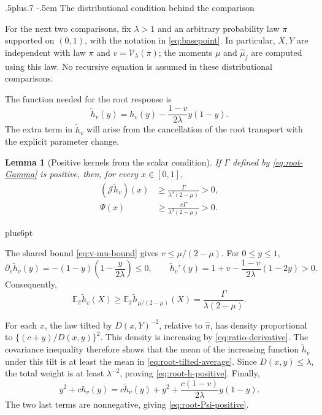 \documentclass[11pt,reqno]{amsart}
\makeatletter
\def\subsection{\@startsection{subsection}{2}{0pt}%
  {.5\linespacing plus.7\linespacing}
  {-.5em}
  {\normalfont\scshape}}
\theoremstyle{plain}
\newtheorem{lemma}[theorem]{Lemma}
\theoremstyle{definition}
\theoremstyle{remark}
\renewenvironment{proof}[1][\proofname]{%
  \par
  \pushQED{\qed}%
  \normalfont
  \topsep6pt plus6pt\relax
  \trivlist
  \item[\hskip\labelsep\slshape #1\@addpunct{.}]%
  \ignorespaces
}{%
  \popQED
  \endtrivlist
  \@endpefalse
}
\DeclareRobustCommand{\qed}{%
  \leavevmode\unskip\penalty9999\hbox{}\nobreak
  \ifmmode
    \makebox[0pt][l]{\qquad\hbox{\qedsymbol}}%
  \else
    \qquad\hbox{\qedsymbol}%
  \fi
}
\renewcommand{\qedsymbol}{\rule[.47pt]{4pt}{6pt}}
\numberwithin{equation}{section}
\newcommand{\E}{\mathbb E}
\newcommand{\cJ}{\mathcal J}
\makeatother
\begin{document}
\subsection{The distributional condition behind the comparison}

For the next two comparisons, fix $\lambda>1$ and an arbitrary probability
law $\pi$ supported on $(0,1)$, with the notation in
\eqref{eq:basepoint}. In particular, $X,Y$ are independent with law $\pi$
and $v=\mathcal V_\lambda(\pi)$; the moments $\mu$ and
$\widehat\mu_j$ are computed using this law. No recursive equation is
assumed in these distributional comparisons.

The function needed for the root response is
\begin{equation}\label{eq:root-h-tilde}
 \widetilde h_v(y)=h_v(y)-\frac{1-v}{2\lambda}y(1-y).
\end{equation}
The extra term in $\widetilde h_v$ will arise from the cancellation of
the root transport with the explicit parameter change.

\begin{lemma}[Positive kernels from the scalar condition]\label{lem:root-kernel}
If $\Gamma$ defined by \eqref{eq:root-Gamma} is positive, then, for every
$x\in[0,1]$,
\begin{align}
 (\cJ\widetilde h_v)(x)
 &\ge\frac{\Gamma}{\lambda^3(2-\mu)}>0,
 \label{eq:root-h-positive}\\
 \Psi(x)&\ge\frac{c\Gamma}{\lambda^3(2-\mu)}>0.
 \label{eq:root-Psi-positive}
\end{align}
\end{lemma}

\begin{proof}
The shared bound \eqref{eq:v-mu-bound} gives $v\le\mu/(2-\mu)$.
For $0\le y\le1$,
\[
 \partial_v\widetilde h_v(y)
 =-(1-y)\left(1-\frac{y}{2\lambda}\right)\le0,
 \qquad
 \widetilde h_v'(y)
 =1+v-\frac{1-v}{2\lambda}(1-2y)>0.
\]
Consequently,
\begin{equation}\label{eq:root-tilted-average}
 \E_{\widehat\pi}\widetilde h_v(X)
 \ge\E_{\widehat\pi}\widetilde h_{\mu/(2-\mu)}(X)
 =\frac{\Gamma}{\lambda(2-\mu)}.
\end{equation}

For each $x$, the law tilted by $D(x,Y)^{-2}$, relative to
$\widehat\pi$, has density proportional to
$\{(c+y)/D(x,y)\}^2$. This density is increasing by
\eqref{eq:ratio-derivative}. The covariance inequality therefore shows
that the mean of the increasing function $\widetilde h_v$ under this
tilt is at least the mean in
\eqref{eq:root-tilted-average}. Since $D(x,y)\le\lambda$, the total
weight is at least $\lambda^{-2}$, proving
\eqref{eq:root-h-positive}. Finally,
\[
 y^2+c h_v(y)
 =c\widetilde h_v(y)+y^2+\frac{c(1-v)}{2\lambda}y(1-y).
\]
The two last terms are nonnegative, giving
\eqref{eq:root-Psi-positive}.
\end{proof}
\end{document}
